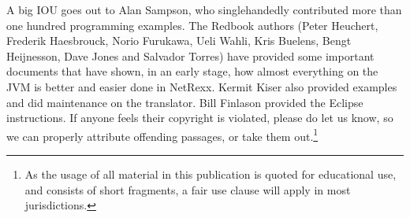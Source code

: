 A big IOU goes out to Alan Sampson, who singlehandedly contributed more than one hundred \nr{} programming examples. The Redbook authors (Peter Heuchert, Frederik Haesbrouck, Norio Furukawa, Ueli Wahli, Kris Buelens, Bengt Heijnesson, Dave Jones and Salvador Torres) have provided some important documents that have shown, in an early stage, how almost everything on the JVM is better and easier done in NetRexx. Kermit Kiser also provided examples and did maintenance on the translator. Bill Finlason provided the Eclipse instructions. If anyone feels their copyright is violated, please do let us know, so we can properly attribute offending passages, or take them out.\footnote{As the usage of all material in this publication is quoted for educational use, and consists of short fragments, a fair use clause will apply in most jurisdictions.}

